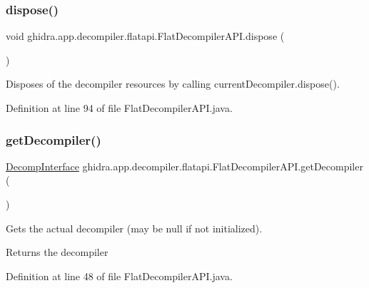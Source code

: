 \subsubsection{\texorpdfstring{dispose()}{dispose()}}
{\footnotesize\ttfamily void ghidra.\+app.\+decompiler.\+flatapi.\+Flat\+Decompiler\+A\+P\+I.\+dispose (\begin{DoxyParamCaption}{ }\end{DoxyParamCaption})\hspace{0.3cm}{\ttfamily [inline]}}

Disposes of the decompiler resources by calling current\+Decompiler.\+dispose(). 

Definition at line 94 of file Flat\+Decompiler\+A\+P\+I.\+java.

\mbox{\label{classghidra_1_1app_1_1decompiler_1_1flatapi_1_1_flat_decompiler_a_p_i_a7cb290f22a0515a68723ad84673e385e}} 
\subsubsection{\texorpdfstring{getDecompiler()}{getDecompiler()}}
{\footnotesize\ttfamily \mbox{\hyperlink{classghidra_1_1app_1_1decompiler_1_1_decomp_interface}{Decomp\+Interface}} ghidra.\+app.\+decompiler.\+flatapi.\+Flat\+Decompiler\+A\+P\+I.\+get\+Decompiler (\begin{DoxyParamCaption}{ }\end{DoxyParamCaption})\hspace{0.3cm}{\ttfamily [inline]}}

Gets the actual decompiler (may be null if not initialized). \begin{DoxyReturn}{Returns}
the decompiler 
\end{DoxyReturn}


Definition at line 48 of file Flat\+Decompiler\+A\+P\+I.\+java.

\mbox{\label{classghidra_1_1app_1_1decompiler_1_1flatapi_1_1_flat_decompiler_a_p_i_af9bcfa6f53c58142ecd498dd1151a31d}} 
